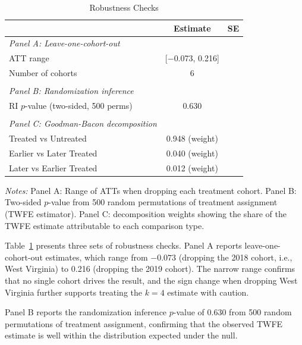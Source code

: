 \documentclass[12pt]{article}
\begin{document}
\begin{table}[htbp]
\centering
\caption{Robustness Checks}
\label{tab:robust}
\begin{threeparttable}
\begin{tabular}{lcc}
\toprule
 & Estimate & SE \\
\midrule
\textit{Panel A: Leave-one-cohort-out} & & \\
ATT range & [$-$0.073, 0.216] & \\
Number of cohorts & 6 & \\
 & & \\
\textit{Panel B: Randomization inference} & & \\
RI $p$-value (two-sided, 500 perms) & 0.630 & \\
 & & \\
\textit{Panel C: Goodman-Bacon decomposition} & & \\
\quad Treated vs Untreated & 0.948 (weight) & \\
\quad Earlier vs Later Treated & 0.040 (weight) & \\
\quad Later vs Earlier Treated & 0.012 (weight) & \\
\bottomrule
\end{tabular}
\begin{tablenotes}[flushleft]\small
\item \textit{Notes:} Panel A: Range of \citet{callaway2021difference} ATTs when dropping each treatment cohort. Panel B: Two-sided $p$-value from 500 random permutations of treatment assignment (TWFE estimator). Panel C: \citet{goodman2021difference} decomposition weights showing the share of the TWFE estimate attributable to each comparison type.
\end{tablenotes}
\end{threeparttable}
\end{table}

Table~\ref{tab:robust} presents three sets of robustness checks. Panel A reports leave-one-cohort-out estimates, which range from $-0.073$ (dropping the 2018 cohort, i.e., West Virginia) to 0.216 (dropping the 2019 cohort). The narrow range confirms that no single cohort drives the result, and the sign change when dropping West Virginia further supports treating the $k = 4$ estimate with caution.

Panel B reports the randomization inference $p$-value of 0.630 from 500 random permutations of treatment assignment, confirming that the observed TWFE estimate is well within the distribution expected under the null.
\end{document}
